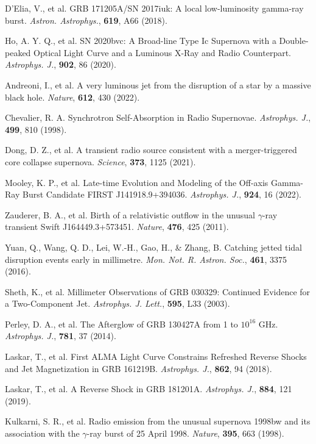 \documentclass{nature_plusfigure}
\newcommand{\mn}{{Mon. Not. R. Astron. Soc.}}
\newcommand{\mnras}{\mn}
\newcommand{\apj}{{Astrophys. J.}}
\newcommand{\apjl}{{Astrophys. J. Lett.}}
\newcommand{\aap}{{Astron. Astrophys.}}
\newcommand{\nat}{{Nature}}
\begin{document}
\begin{methods}
\begin{thebibliography}{10}
 D'Elia, V., et al. GRB 171205A/SN 2017iuk: A local low-luminosity gamma-ray burst. \emph{\aap}, \textbf{619}, A66 (2018). 

 Ho, A. Y. Q., et al. SN 2020bvc: A Broad-line Type Ic Supernova with a Double-peaked Optical Light Curve and a Luminous X-Ray and Radio Counterpart. \emph{\apj}, \textbf{902}, 86 (2020). 

 Andreoni, I., et al. A very luminous jet from the disruption of a star by a massive black hole. \emph{\nat}, \textbf{612}, 430 (2022). 

 
 Chevalier, R. A. Synchrotron Self-Absorption in Radio Supernovae. \emph{\apj}, \textbf{499}, 810 (1998). 
 
 Dong, D. Z., et al. A transient radio source consistent with a merger-triggered core collapse supernova. \emph{Science}, \textbf{373}, 1125 (2021). 

 Mooley, K. P., et al. Late-time Evolution and Modeling of the Off-axis Gamma-Ray Burst Candidate FIRST J141918.9+394036. \emph{\apj}, \textbf{924}, 16 (2022). 


  Zauderer, B. A., et al. Birth of a relativistic outflow in the unusual $\gamma$-ray transient Swift J164449.3+573451. \emph{\nat}, \textbf{476}, 425 (2011). 

 Yuan, Q., Wang, Q. D., Lei, W.-H., Gao, H., \& Zhang, B. Catching jetted tidal disruption events early in millimetre. \emph{\mnras}, \textbf{461}, 3375 (2016). 

 Sheth, K., et al. Millimeter Observations of GRB 030329: Continued Evidence for a Two-Component Jet. \emph{\apjl}, \textbf{595}, L33 (2003). 

 Perley, D. A., et al. The Afterglow of GRB 130427A from 1 to $10^{16}$ GHz. \emph{\apj}, \textbf{781}, 37 (2014). 

 Laskar, T., et al. First ALMA Light Curve Constrains Refreshed Reverse Shocks and Jet Magnetization in GRB 161219B. \emph{\apj}, \textbf{862}, 94 (2018). 

 Laskar, T., et al. A Reverse Shock in GRB 181201A. \emph{\apj}, \textbf{884}, 121 (2019). 

 Kulkarni, S. R., et al. Radio emission from the unusual supernova 1998bw and its association with the $\gamma$-ray burst of 25 April 1998. \emph{\nat}, \textbf{395}, 663 (1998). 


\end{thebibliography}
\end{methods}
\end{document}
